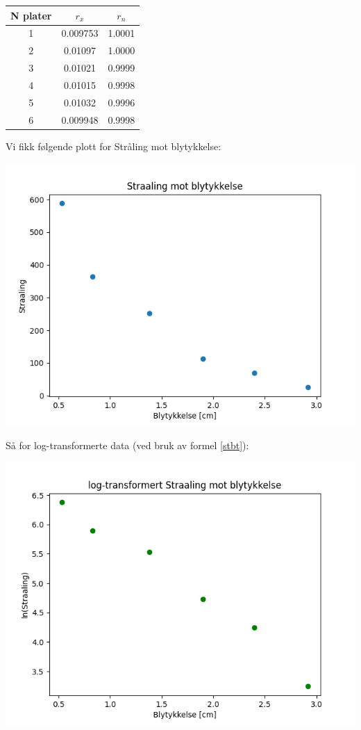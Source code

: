 \begin{center}
\begin{tabular}{ | c | c | c |}
    \hline
    N plater & $r_x$ &  $r_n$\\ 
    \hline
    1 & 0.009753 & 1.0001\\ 
    \hline
    2 & 0.01097 & 1.0000\\ 
    \hline
    3 & 0.01021 & 0.9999\\ 
    \hline
    4 & 0.01015 & 0.9998\\ 
    \hline
    5 & 0.01032 & 0.9996\\ 
    \hline
    6 & 0.009948 & 0.9998\\  
    \hline
\end{tabular}
\end{center}

Vi fikk følgende plott for Stråling mot blytykkelse:

\begin{center}
\includegraphics[scale=0.7]{Figurer/Straaling_Bly.png}
\end{center}

Så for log-transformerte data (ved bruk av formel \ref{stbt}):

\begin{center}
\includegraphics[scale=0.7]{Figurer/LogStraaling_Bly.png}
\end{center}

